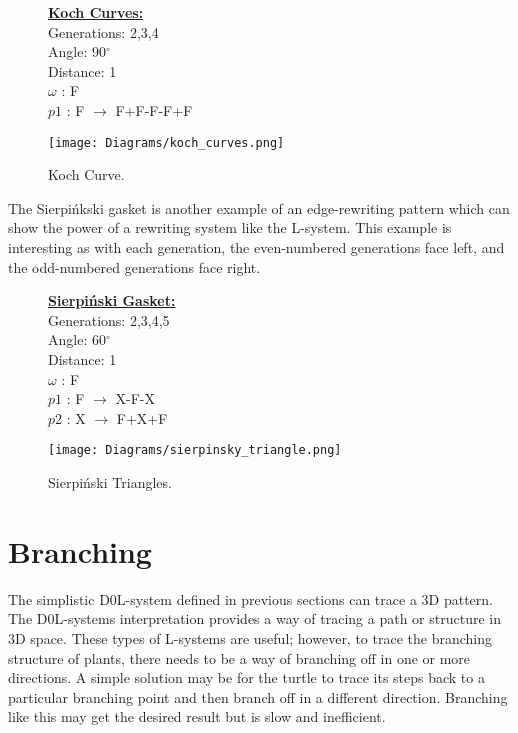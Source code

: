 \begin{figure}[htbp]
	\raggedright
	\textbf{\underline{Koch Curves:}} \\
	Generations: 2,3,4\\
	Angle: 90$^\circ$\\
	Distance: 1\\
	$\omega$ : F \\
	$p1$ : F $\rightarrow$ F+F-F-F+F\\
	{\centering
		\vspace{7px}
		\texttt{[image: Diagrams/koch\_curves.png]}
		\caption{Koch Curve.} \label{KochSnowflake}
	}
\end{figure}
\FloatBarrier

\noindent
The Sierpi\'{n}kski gasket is another example of an edge-rewriting pattern which can show the power of a rewriting system like the L-system. This example is interesting as with each generation, the even-numbered generations face left, and the odd-numbered generations face right.


\begin{figure}[htbp]
	\raggedright
	\textbf{\underline{Sierpi\'{n}ski Gasket:}} \\
	Generations: 2,3,4,5\\
	Angle: 60$^\circ$\\
	Distance: 1\\
	$\omega$ : F\\
	$p1$ : F $\rightarrow$ X-F-X\\
	$p2$ : X $\rightarrow$ F+X+F\\
	{\centering
		\vspace{7px}
		\texttt{[image: Diagrams/sierpinsky\_triangle.png]}
		\caption{Sierpi\'{n}ski Triangles.}
	}
\end{figure}
\FloatBarrier

\section{Branching} \label{branching}


The simplistic D0L-system defined in previous sections can trace a 3D pattern. The D0L-systems interpretation provides a way of tracing a path or structure in 3D space. These types of L-systems are useful; however, to trace the branching structure of plants, there needs to be a way of branching off in one or more directions. A simple solution may be for the turtle to trace its steps back to a particular branching point and then branch off in a different direction. Branching like this may get the desired result but is slow and inefficient. 

